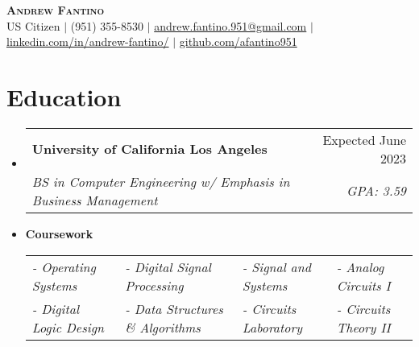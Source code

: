 \documentclass[letterpaper,11pt]{article}
\makeatletter
\newcommand{\resumeSubheading}[4]{
  \vspace{-2pt}\item
    \begin{tabular*}{0.97\textwidth}[t]{l@{\extracolsep{\fill}}r}
      \textbf{#1} & #2 \\
      \textit{\small#3} & \textit{\small #4} \\
    \end{tabular*}\vspace{-7pt}
}
\newcommand{\resumeSubHeadingListStart}{\begin{itemize}[leftmargin=0.15in, label={}]}
\newcommand{\resumeSubHeadingListEnd}{\end{itemize}}
\makeatother
\begin{document}

\begin{center}
    \textbf{\Huge \scshape Andrew Fantino} \\ \vspace{1pt}
    \small US Citizen $|$
    \small (951) 355-8530 $|$ 
    \href{mailto:andrew.fantino.951@gmail.com}{andrew.fantino.951@gmail.com} $|$ 
    \href{https://linkedin.com/in/andrew-fantino/}{linkedin.com/in/andrew-fantino/} $|$
    \href{https://github.com/afantino951}{github.com/afantino951}
\end{center}


\section{Education}
  \resumeSubHeadingListStart
    \resumeSubheading
      {University of California Los Angeles}{Expected June 2023}
      {BS in Computer Engineering w/ Emphasis in Business Management}{GPA: 3.59}
      \vspace{-2pt}\item
      \textbf{Coursework} \\
      \begin{tabular*}{0.97\textwidth}{ p{10em} p{13em} p{10em} p{8em} }
        \textit{\small- Operating Systems} & \textit{\small- Digital Signal Processing} & \textit{\small- Signal and Systems} & \textit{\small- Analog Circuits I} \\
        \textit{\small- Digital Logic Design} & \textit{\small- Data Structures \& Algorithms} & \textit{\small- Circuits Laboratory} & \textit{\small- Circuits Theory II} \\
      \end{tabular*}\vspace{-7pt}

  \resumeSubHeadingListEnd


\end{document}

